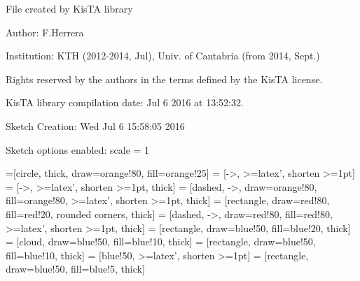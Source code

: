 \documentclass[a4paper,10pt]{article}
\begin{document}
File created by KisTA library

Author: F.Herrera

Institution: KTH (2012-2014, Jul), Univ. of Cantabria (from 2014, Sept.)

Rights reserved by the authors in the terms defined by the KisTA license.

KisTA library compilation date: Jul  6 2016 at 13:52:32.



Sketch Creation: Wed Jul  6 15:58:05 2016


Sketch options enabled:
scale = 1
\hfill


=[circle, thick, draw=orange!80, fill=orange!25]
 = [->, >=latex', shorten >=1pt]
 = [->, >=latex', shorten >=1pt, thick]
 = [dashed, ->, draw=orange!80, fill=orange!80, >=latex', shorten >=1pt, thick]
 = [rectangle, draw=red!80, fill=red!20, rounded corners, thick]
 = [dashed, ->, draw=red!80, fill=red!80, >=latex', shorten >=1pt, thick]
 = [rectangle, draw=blue!50, fill=blue!20, thick]
 = [cloud, draw=blue!50, fill=blue!10, thick]
 = [rectangle, draw=blue!50, fill=blue!10, thick]
 = [blue!50, >=latex', shorten >=1pt]
 = [rectangle, draw=blue!50,  fill=blue!5, thick]
\end{document}
